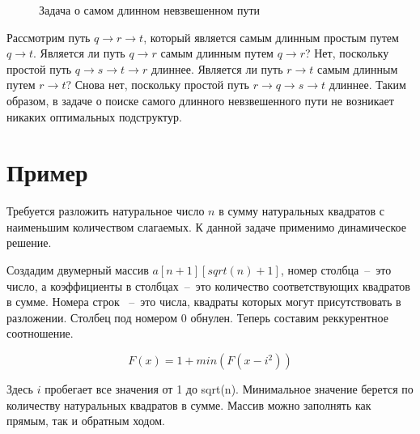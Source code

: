 \documentclass[a4paper,12pt] {report} 			%
\begin{document}
\begin{figure} [h]
\caption{Задача о самом длинном невзвешенном пути}
\end{figure}

Рассмотрим путь $q \rightarrow r \rightarrow t$, который является самым длинным простым путем $q \longrightarrow t$. Является ли путь $q\rightarrow r$ самым длинным путем $q \longrightarrow r$? Нет, поскольку простой путь $q \rightarrow s \rightarrow t \rightarrow r$ длиннее. Является ли путь $r \rightarrow t$ самым длинным путем $r \longrightarrow t$? Снова нет, поскольку простой путь $r \rightarrow q \rightarrow s \rightarrow t$ длиннее. Таким образом, в задаче о поиске самого длинного невзвешенного пути не возникает никаких оптимальных подструктур.

\section{Пример}

Требуется разложить натуральное число $n$ в сумму натуральных квадратов с наименьшим количеством слагаемых. К данной задаче применимо динамическое решение.

Создадим двумерный массив $a[n + 1][sqrt(n) + 1]$, номер столбца~--~это число, а коэффициенты в столбцах~--~это количество соответствующих квадратов в сумме. Номера строк ~--~это числа, квадраты которых могут присутствовать в разложении. Столбец под номером 0 обнулен. Теперь составим реккурентное соотношение.

$$F(x) = 1 + min(F(x - i^2))$$

Здесь $i$ пробегает все значения от 1 до sqrt(n). Минимальное значение берется по количеству натуральных квадратов в сумме. Массив можно заполнять как прямым, так и обратным ходом.
\end{document}
